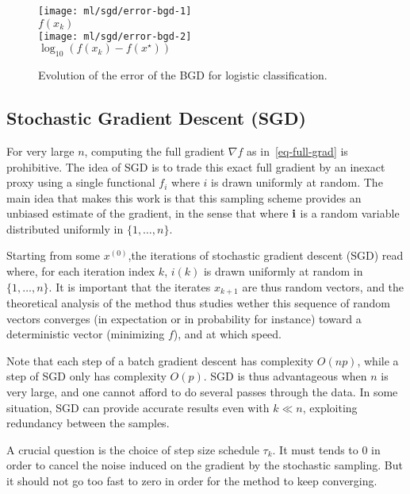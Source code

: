 \begin{figure}
\centering
\texttt{[image: ml/sgd/error-bgd-1]} \\
$f(x_k)$ \\
\texttt{[image: ml/sgd/error-bgd-2]} \\
$\log_{10}(f(x_k)-f(x^\star))$ 
\caption{\label{fig-bgd}
Evolution of the error of the BGD for logistic classification.
}
\end{figure}



\subsection{Stochastic Gradient Descent (SGD)}

For very large $n$, computing the full gradient $\nabla f$ as in~\eqref{eq-full-grad} is prohibitive.  
%
The idea of SGD is to trade this exact full gradient by an inexact proxy using a single functional $f_{i}$ where $i$ is drawn uniformly at random. The main idea that makes this work is that this sampling scheme provides an unbiased estimate of the gradient, in the sense that
where $\mathrm{\bf i}$ is a random variable distributed uniformly in $\{1,\ldots,n\}$.

Starting from some $x^{(0)}$,the iterations of stochastic gradient descent (SGD) read
where, for each iteration index $k$, $i(k)$
is drawn uniformly at random in $\{1,\ldots,n\}$. 
%
It is important that the iterates $x_{k+1}$ are thus random vectors, and the theoretical analysis of the method thus studies wether this sequence of random vectors converges (in expectation or in probability for instance) toward a deterministic vector (minimizing $f$), and at which speed. 

Note that each step of a batch gradient descent has complexity $O(np)$,
while a step of SGD only has complexity $O(p)$. SGD is thus
advantageous when $n$ is very large, and one cannot afford to do
several passes through the data. In some situation, SGD can provide
accurate results even with $k \ll n$, exploiting redundancy between
the samples.

A crucial question is the choice of step size schedule $\tau_k$. It
must tends to 0 in order to cancel the noise induced on the gradient by
the stochastic sampling. But it should not go too fast to zero in order
for the method to keep converging. 


